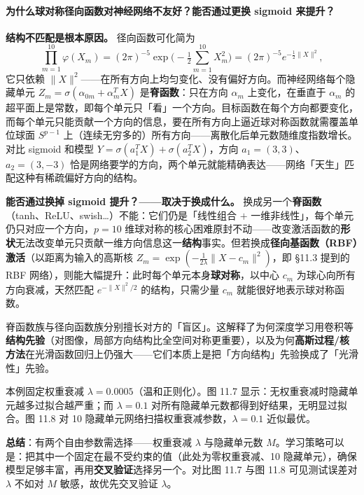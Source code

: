 \paragraph{为什么球对称径向函数对神经网络不友好？能否通过更换 sigmoid 来提升？}

\textbf{结构不匹配是根本原因。} 径向函数可化简为
\[
\prod_{m=1}^{10}\varphi(X_m) = (2\pi)^{-5}\exp\!\Big(-\tfrac12\textstyle\sum_{m=1}^{10} X_m^2\Big) = (2\pi)^{-5}e^{-\frac12\|X\|^2},
\]
它只依赖 $\|X\|^2$——在所有方向上均匀变化、没有偏好方向。而神经网络每个隐藏单元 $Z_m=\sigma(\alpha_{0m}+\alpha_m^T X)$ 是\textbf{脊函数}：只在方向 $\alpha_m$ 上变化，在垂直于 $\alpha_m$ 的超平面上是常数，即每个单元只「看」一个方向。目标函数在每个方向都要变化，而每个单元只能贡献一个方向的信息，要在所有方向上逼近球对称函数就需覆盖单位球面 $S^{p-1}$ 上（连续无穷多的）所有方向——离散化后单元数随维度指数增长。对比 sigmoid 和模型 $Y=\sigma(a_1^T X)+\sigma(a_2^T X)$，方向 $a_1=(3,3)$、$a_2=(3,-3)$ 恰是网络要学的方向，两个单元就能精确表达——网络「天生」匹配这种有稀疏偏好方向的结构。

\textbf{能否通过换掉 sigmoid 提升？——取决于换成什么。} 换成另一个\textbf{脊函数}（tanh、ReLU、swish…）不能：它们仍是「线性组合 $+$ 一维非线性」，每个单元仍只对应一个方向，$p=10$ 维球对称的核心困难原封不动——改变激活函数的\textbf{形状}无法改变单元只贡献一维方向信息这一\textbf{结构}事实。但若换成\textbf{径向基函数（RBF）激活}（以距离为输入的高斯核 $Z_m=\exp(-\frac{1}{2\lambda}\|X-c_m\|^2)$，即 §11.3 提到的 RBF 网络），则能大幅提升：此时每个单元本身\textbf{球对称}，以中心 $c_m$ 为球心向所有方向衰减，天然匹配 $e^{-\|X\|^2/2}$ 的结构，只需少量 $c_m$ 就能很好地表示球对称函数。

\begin{remark}[现代视角]
脊函数族与径向函数族分别擅长对方的「盲区」。这解释了为何深度学习用卷积等\textbf{结构先验}（对图像，局部方向结构比全空间对称更重要），以及为何\textbf{高斯过程/核方法}在光滑函数回归上仍强大——它们本质上是把「方向结构」先验换成了「光滑性」先验。
\end{remark}

\begin{remark}[正则化的作用]
本例固定权重衰减 $\lambda = 0.0005$（温和正则化）。图 11.7 显示：无权重衰减时隐藏单元越多过拟合越严重；而 $\lambda = 0.1$ 对所有隐藏单元数都得到好结果，无明显过拟合。图 11.8 对 10 隐藏单元网络扫描权重衰减参数，$\lambda = 0.1$ 近似最优。

\textbf{总结}：有两个自由参数需选择——权重衰减 $\lambda$ 与隐藏单元数 $M$。学习策略可以是：把其中一个固定在最不受约束的值（此处为零权重衰减、10 隐藏单元），确保模型足够丰富，再用\textbf{交叉验证}选择另一个。对比图 11.7 与图 11.8 可见测试误差对 $\lambda$ 不如对 $M$ 敏感，故优先交叉验证 $\lambda$。
\end{remark}

